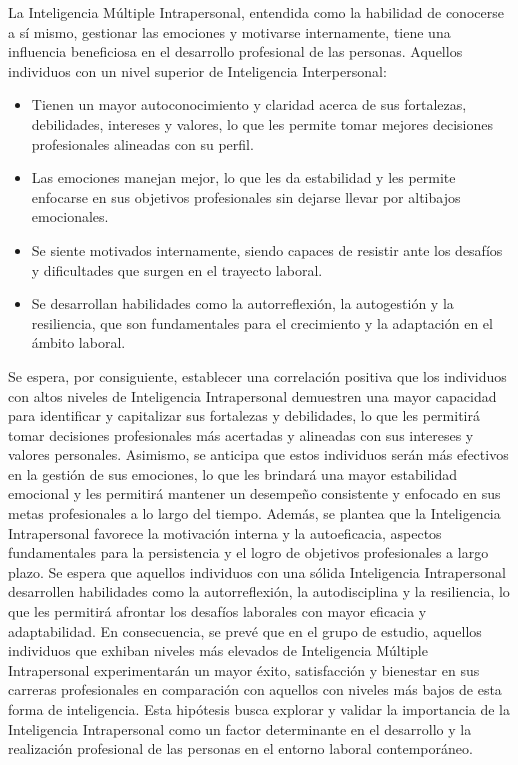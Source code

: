 La Inteligencia Múltiple Intrapersonal, entendida como la habilidad de conocerse a sí mismo, gestionar las emociones y motivarse internamente, tiene una influencia beneficiosa en el desarrollo profesional de las personas. Aquellos individuos con un nivel superior de Inteligencia Interpersonal:
\begin{itemize}
\item Tienen un mayor autoconocimiento y claridad acerca de sus fortalezas, debilidades, intereses y valores, lo que les permite tomar mejores decisiones profesionales alineadas con su perfil.
\item Las emociones manejan mejor, lo que les da estabilidad y les permite enfocarse en sus objetivos profesionales sin dejarse llevar por altibajos emocionales.
\item Se siente motivados internamente, siendo capaces de resistir ante los desafíos y dificultades que surgen en el trayecto laboral.
\item Se desarrollan habilidades como la autorreflexión, la autogestión y la resiliencia, que son fundamentales para el crecimiento y la adaptación en el ámbito laboral.
\end{itemize}
Se espera, por consiguiente, establecer una correlación positiva que los individuos con altos niveles de Inteligencia Intrapersonal demuestren una mayor capacidad para identificar y capitalizar sus fortalezas y debilidades, lo que les permitirá tomar decisiones profesionales más acertadas y alineadas con sus intereses y valores personales. Asimismo, se anticipa que estos individuos serán más efectivos en la gestión de sus emociones, lo que les brindará una mayor estabilidad emocional y les permitirá mantener un desempeño consistente y enfocado en sus metas profesionales a lo largo del tiempo.
Además, se plantea que la Inteligencia Intrapersonal favorece la motivación interna y la autoeficacia, aspectos fundamentales para la persistencia y el logro de objetivos profesionales a largo plazo. Se espera que aquellos individuos con una sólida Inteligencia Intrapersonal desarrollen habilidades como la autorreflexión, la autodisciplina y la resiliencia, lo que les permitirá afrontar los desafíos laborales con mayor eficacia y adaptabilidad.
En consecuencia, se prevé que en el grupo de estudio, aquellos individuos que exhiban niveles más elevados de Inteligencia Múltiple Intrapersonal experimentarán un mayor éxito, satisfacción y bienestar en sus carreras profesionales en comparación con aquellos con niveles más bajos de esta forma de inteligencia. Esta hipótesis busca explorar y validar la importancia de la Inteligencia Intrapersonal como un factor determinante en el desarrollo y la realización profesional de las personas en el entorno laboral contemporáneo.
